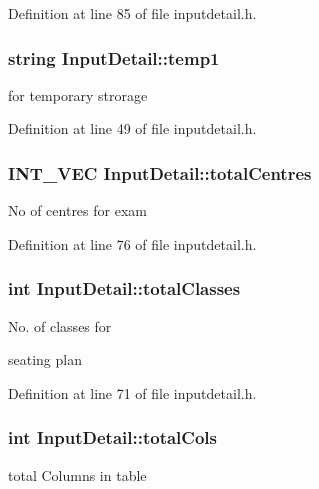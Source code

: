 Definition at line 85 of file inputdetail.\-h.

\hypertarget{classInputDetail_aa5659e496977cc83f743725f6aaf2d6a}{
\subsubsection[{temp1}]{\setlength{\rightskip}{0pt plus 5cm}string Input\-Detail\-::temp1\hspace{0.3cm}{\ttfamily [protected]}}}\label{classInputDetail_aa5659e496977cc83f743725f6aaf2d6a}
for temporary strorage 

Definition at line 49 of file inputdetail.\-h.

\hypertarget{classInputDetail_a11f9eb0c33682bf3c9b1e2cac50ebaad}{
\subsubsection[{total\-Centres}]{\setlength{\rightskip}{0pt plus 5cm}I\-N\-T\-\_\-\-V\-E\-C Input\-Detail\-::total\-Centres\hspace{0.3cm}{\ttfamily [protected]}}}\label{classInputDetail_a11f9eb0c33682bf3c9b1e2cac50ebaad}
No of centres for exam 

Definition at line 76 of file inputdetail.\-h.

\hypertarget{classInputDetail_aac4c49f5453d86c4c79bcb87361ad28d}{
\subsubsection[{total\-Classes}]{\setlength{\rightskip}{0pt plus 5cm}int Input\-Detail\-::total\-Classes\hspace{0.3cm}{\ttfamily [protected]}}}\label{classInputDetail_aac4c49f5453d86c4c79bcb87361ad28d}
\begin{DoxyVerb}                   No. of classes for 
\end{DoxyVerb}
 seating plan 

Definition at line 71 of file inputdetail.\-h.

\hypertarget{classInputDetail_aeba19a14044746fd0c87b356d05d88c0}{
\subsubsection[{total\-Cols}]{\setlength{\rightskip}{0pt plus 5cm}int Input\-Detail\-::total\-Cols\hspace{0.3cm}{\ttfamily [protected]}}}\label{classInputDetail_aeba19a14044746fd0c87b356d05d88c0}
total Columns in table 

